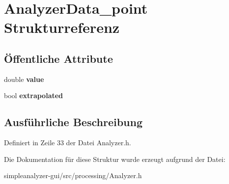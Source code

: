 \hypertarget{structAnalyzerData__point}{\section{Analyzer\-Data\-\_\-point Strukturreferenz}
\label{structAnalyzerData__point}
}
\subsection*{Öffentliche Attribute}
\begin{DoxyCompactItemize}
\item 
\hypertarget{structAnalyzerData__point_a9d91020954e9fa29a831b83e18c7c245}{double {\bfseries value}}\label{structAnalyzerData__point_a9d91020954e9fa29a831b83e18c7c245}

\item 
\hypertarget{structAnalyzerData__point_a933796e194e5d607e1e1d07e15ab04e5}{bool {\bfseries extrapolated}}\label{structAnalyzerData__point_a933796e194e5d607e1e1d07e15ab04e5}

\end{DoxyCompactItemize}


\subsection{Ausführliche Beschreibung}


Definiert in Zeile 33 der Datei Analyzer.\-h.



Die Dokumentation für diese Struktur wurde erzeugt aufgrund der Datei\-:\begin{DoxyCompactItemize}
\item 
simpleanalyzer-\/gui/src/processing/Analyzer.\-h\end{DoxyCompactItemize}
